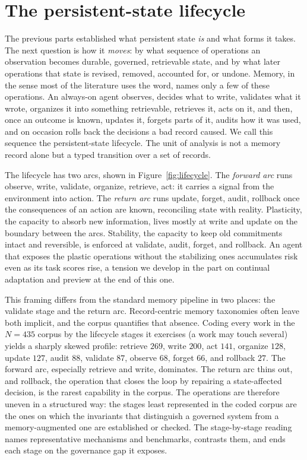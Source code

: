\section{The persistent-state lifecycle}\label{sec:lifecycle}


The previous parts established what persistent state \emph{is} and what forms it takes. The next question is how it \emph{moves}: by what sequence of operations an observation becomes durable, governed, retrievable state, and by what later operations that state is revised, removed, accounted for, or undone. Memory, in the sense most of the literature uses the word, names only a few of these operations. An always-on agent observes, decides what to write, validates what it wrote, organizes it into something retrievable, retrieves it, acts on it, and then, once an outcome is known, updates it, forgets parts of it, audits how it was used, and on occasion rolls back the decisions a bad record caused. We call this sequence the persistent-state lifecycle. The unit of analysis is not a memory record alone but a typed transition over a set of records.

The lifecycle has two arcs, shown in Figure~\ref{fig:lifecycle}. The \emph{forward arc} runs observe, write, validate, organize, retrieve, act: it carries a signal from the environment into action. The \emph{return arc} runs update, forget, audit, rollback once the consequences of an action are known, reconciling state with reality. Plasticity, the capacity to absorb new information, lives mostly at write and update on the boundary between the arcs. Stability, the capacity to keep old commitments intact and reversible, is enforced at validate, audit, forget, and rollback. An agent that exposes the plastic operations without the stabilizing ones accumulates risk even as its task scores rise, a tension we develop in the part on continual adaptation and preview at the end of this one.

This framing differs from the standard memory pipeline in two places: the validate stage and the return arc. Record-centric memory taxonomies often leave both implicit, and the corpus quantifies that absence. Coding every work in the $N{=}435$ corpus by the lifecycle stages it exercises (a work may touch several) yields a sharply skewed profile: retrieve $269$, write $200$, act $141$, organize $128$, update $127$, audit $88$, validate $87$, observe $68$, forget $66$, and rollback $27$. The forward arc, especially retrieve and write, dominates. The return arc thins out, and rollback, the operation that closes the loop by repairing a state-affected decision, is the rarest capability in the corpus. The operations are therefore uneven in a structured way: the stages least represented in the coded corpus are the ones on which the invariants that distinguish a governed system from a memory-augmented one are established or checked. The stage-by-stage reading names representative mechanisms and benchmarks, contrasts them, and ends each stage on the governance gap it exposes.

